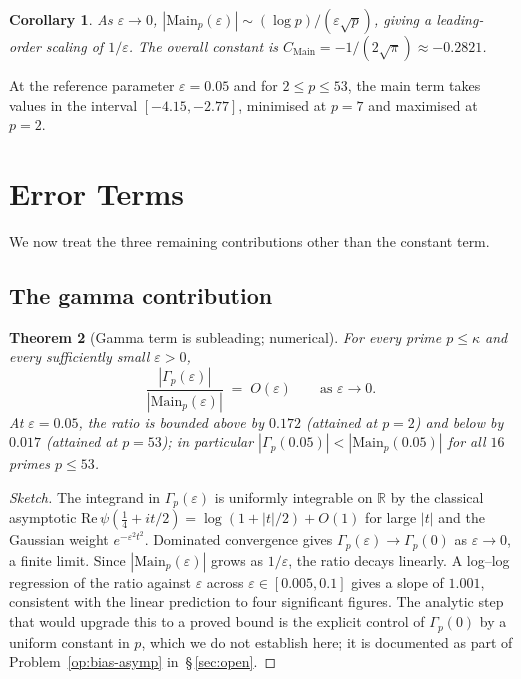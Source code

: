 \documentclass[11pt]{article}
\newtheorem{theorem}{Theorem}[section]
\newtheorem{corollary}[theorem]{Corollary}
\begin{document}
\begin{corollary}
\label{cor:main-scaling}
As $\varepsilon\to 0$, $|\mathrm{Main}_p(\varepsilon)|\sim
(\log p)/(\varepsilon\sqrt p)$, giving a leading-order scaling of
$1/\varepsilon$.
The overall constant is $C_{\mathrm{Main}}=-1/(2\sqrt\pi)\approx-0.2821$.
\end{corollary}

At the reference parameter $\varepsilon=0.05$ and for $2\le p\le 53$,
the main term takes values in the interval $[-4.15,-2.77]$, minimised
at $p=7$ and maximised at $p=2$.

\section{Error Terms}
\label{sec:errors}

We now treat the three remaining contributions other than the constant
term.

\subsection{The gamma contribution}

\begin{theorem}[Gamma term is subleading; numerical]
\label{thm:gamma}
For every prime $p\le\kappa$ and every sufficiently small
$\varepsilon>0$,
\[
\frac{|\Gamma_p(\varepsilon)|}{|\mathrm{Main}_p(\varepsilon)|}
\;=\; O(\varepsilon) \qquad \text{as } \varepsilon\to 0.
\]
At $\varepsilon=0.05$, the ratio is bounded above by $0.172$ (attained
at $p=2$) and below by $0.017$ (attained at $p=53$); in particular
$|\Gamma_p(0.05)|<|\mathrm{Main}_p(0.05)|$ for all $16$ primes $p\le 53$.
\end{theorem}

\begin{proof}[Sketch]
The integrand in $\Gamma_p(\varepsilon)$ is uniformly integrable on
$\mathbb R$ by the classical asymptotic
$\mathrm{Re}\,\psi(\tfrac14+it/2)=\log(1+|t|/2)+O(1)$ for large $|t|$
and the Gaussian weight $e^{-\varepsilon^2 t^2}$.
Dominated convergence gives $\Gamma_p(\varepsilon)\to\Gamma_p(0)$ as
$\varepsilon\to 0$, a finite limit.
Since $|\mathrm{Main}_p(\varepsilon)|$ grows as $1/\varepsilon$, the
ratio decays linearly.
A log--log regression of the ratio against $\varepsilon$ across
$\varepsilon\in[0.005,0.1]$ gives a slope of $1.001$, consistent with
the linear prediction to four significant figures.
The analytic step that would upgrade this to a proved bound is the
explicit control of $\Gamma_p(0)$ by a uniform constant in $p$, which
we do not establish here; it is documented as part of
Problem~\ref{op:bias-asymp} in~\S\,\ref{sec:open}.
\end{proof}
\end{document}
